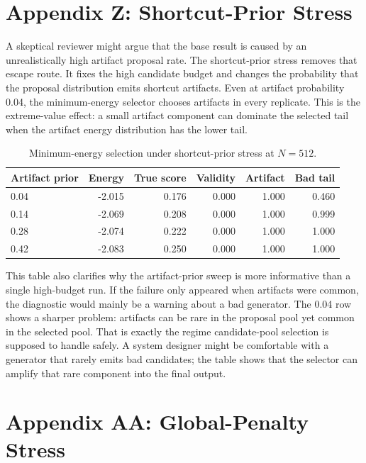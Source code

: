 \documentclass{article}
\begin{document}
\section{Appendix Z: Shortcut-Prior Stress}

A skeptical reviewer might argue that the base result is caused by an
unrealistically high artifact proposal rate. The shortcut-prior stress removes
that escape route. It fixes the high candidate budget and changes the
probability that the proposal distribution emits shortcut artifacts. Even at
artifact probability 0.04, the minimum-energy selector chooses artifacts in
every replicate. This is the extreme-value effect: a small artifact component
can dominate the selected tail when the artifact energy distribution has the
lower tail.

\begin{table}[t]
\centering
\small
\begin{tabular}{lrrrrr}
\toprule
Artifact prior & Energy & True score & Validity & Artifact & Bad tail \\
\midrule
0.04 & -2.015 & 0.176 & 0.000 & 1.000 & 0.460 \\
0.14 & -2.069 & 0.208 & 0.000 & 1.000 & 0.999 \\
0.28 & -2.074 & 0.222 & 0.000 & 1.000 & 1.000 \\
0.42 & -2.083 & 0.250 & 0.000 & 1.000 & 1.000 \\
\bottomrule
\end{tabular}
\caption{Minimum-energy selection under shortcut-prior stress at $N=512$.}
\label{tab:prior-stress}
\end{table}

This table also clarifies why the artifact-prior sweep is more informative
than a single high-budget run. If the failure only appeared when artifacts were
common, the diagnostic would mainly be a warning about a bad generator. The
0.04 row shows a sharper problem: artifacts can be rare in the proposal pool
yet common in the selected pool. That is exactly the regime candidate-pool
selection is supposed to handle safely. A system designer might be comfortable
with a generator that rarely emits bad candidates; the table shows that the
selector can amplify that rare component into the final output.

\section*{Appendix AA: Global-Penalty Stress}
\end{document}
